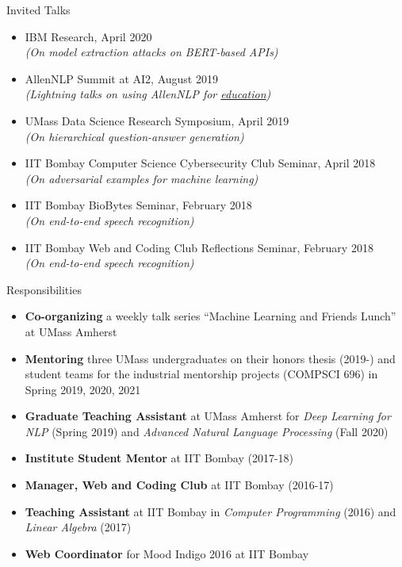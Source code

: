 \documentclass{resume} %
\begin{document}
\begin{rSection}{Invited Talks}
\vspace*{0.1in}
\begin{itemize}[leftmargin=*]
\item IBM Research, April 2020\\
\textit{(On model extraction attacks on BERT-based APIs)}
\item AllenNLP Summit at AI2, August 2019 \\
\textit{(Lightning talks on using AllenNLP for \href{https://github.com/martiansideofthemoon/allennlp-probe-hw}{education})}
\item UMass Data Science Research Symposium, April 2019 \\
\textit{(On hierarchical question-answer generation)}
\item IIT Bombay Computer Science Cybersecurity Club Seminar, April 2018 \\
\textit{(On adversarial examples for machine learning)}
\item IIT Bombay BioBytes Seminar, February 2018\\
\textit{(On end-to-end speech recognition)}
\item IIT Bombay Web and Coding Club Reflections Seminar, February 2018 \\
\textit{(On end-to-end speech recognition)}
\end{itemize}
\end{rSection}

\begin{rSection}{Responsibilities}
\vspace*{0.1in}
\begin{itemize}[leftmargin=*]
\item \textbf{Co-organizing} a weekly talk series ``Machine Learning and Friends Lunch'' at UMass Amherst
\item \textbf{Mentoring} three UMass undergraduates on their honors thesis (2019-) and student teams for the industrial mentorship projects (COMPSCI 696) in Spring 2019, 2020, 2021
\item \textbf{Graduate Teaching Assistant} at UMass Amherst for \textit{Deep Learning for NLP} (Spring 2019) and \textit{Advanced Natural Language Processing} (Fall 2020)
\item \textbf{Institute Student Mentor} at IIT Bombay (2017-18)
\item \textbf{Manager, Web and Coding Club} at IIT Bombay (2016-17)
\item \textbf{Teaching Assistant} at IIT Bombay in \textit{Computer Programming} (2016) and \textit{Linear Algebra} (2017)
\item \textbf{Web Coordinator} for Mood Indigo 2016 at IIT Bombay
\end{itemize}
\end{rSection}
\end{document}
